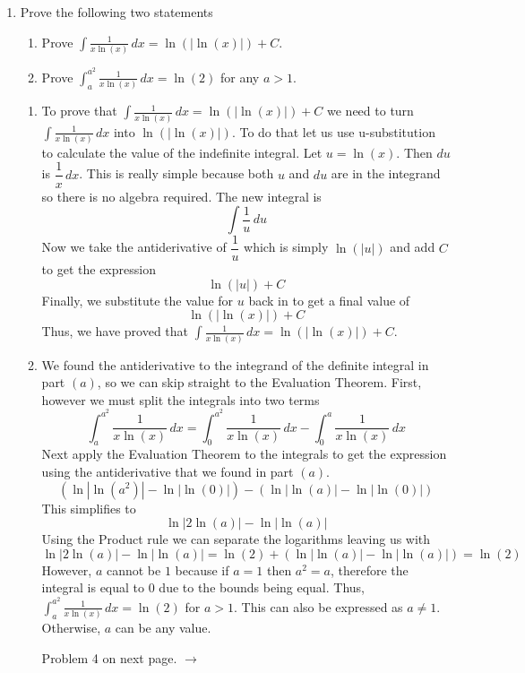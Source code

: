 \documentclass{article}
\begin{document}
\begin{enumerate}[label=\textbf{(3.\arabic*)}]
\newpage %

\item Prove the following two statements
\begin{enumerate}[label=(\alph*)]
\item Prove $\displaystyle{ \int\!\frac{1}{x\ln(x)}\,dx=\ln\left(\left|\ln(x)\right|\right)+C}$.
\item Prove $\displaystyle{ \int_a^{a^2}\!\frac{1}{x\ln(x)}\,dx=\ln(2) }$ for any $a>1$. \\
\newline
\end{enumerate}

\begin{enumerate}[label=(\alph*)]
\item To prove that $\displaystyle{ \int\!\frac{1}{x\ln(x)}\,dx=\ln\left(\left|\ln(x)\right|\right)+C}$ we need to turn $\displaystyle{ \int\!\frac{1}{x\ln(x)}\,dx }$ into $\ln\left(\left|\ln(x)\right|\right)$. To do that let us use u-substitution to calculate the value of the indefinite integral.
\newline
Let $u=\ln(x)$. Then $du$ is $\dfrac{1}{x}\,dx$. This is really simple because both $u$ and $du$ are in the integrand so there is no algebra required. The new integral is
\[\int\!\frac{1}{u}\,du\]
Now we take the antiderivative of $\dfrac{1}{u}$ which is simply $\ln(|u|)$ and add $C$ to get the expression
\[\ln(|u|)+C\]
Finally, we substitute the value for $u$ back in to get a final value of
\[\ln\left(\left|\ln(x)\right|\right)+C\]
Thus, we have proved that $\displaystyle{ \int\!\frac{1}{x\ln(x)}\,dx=\ln\left(\left|\ln(x)\right|\right)+C}$. \\%
\newline
\item We found the antiderivative to the integrand of the definite integral in part $(a)$, so we can skip straight to the Evaluation Theorem. First, however we must split the integrals into two terms
\[\int_a^{a^2}\!\frac{1}{x\ln(x)}\,dx=\int_0^{a^2}\!\frac{1}{x\ln(x)}\,dx-\int_0^a\!\frac{1}{x\ln(x)}\,dx\]
Next apply the Evaluation Theorem to the integrals to get the expression using the antiderivative that we found in part $(a)$.
\[\left(\ln\left|\ln\left(a^2\right)\right|-\ln\left|\ln\left(0\right)\right|\right)-\left(\ln\left|\ln(a)\right|-\ln\left|\ln(0)\right|\right)\]
This simplifies to
\[\ln\left|2\ln(a)\right|-\ln\left|\ln(a)\right|\]
Using the Product rule we can separate the logarithms leaving us with
\[\ln\left|2\ln(a)\right|-\ln\left|\ln(a)\right|=\ln(2)+\left(\ln\left|\ln(a)\right|-\ln\left|\ln(a)\right|\right)=\ln(2)\]
However, $a$ cannot be $1$ because if $a=1$ then $a^2=a$, therefore the integral is equal to 0 due to the bounds being equal. Thus, $\displaystyle{ \int_a^{a^2}\!\frac{1}{x\ln(x)}\,dx=\ln(2) }$ for $a>1$. This can also be expressed as $a\neq 1$. Otherwise, $a$ can be any value.
\newline
\begin{center}
Problem 4 on next page. $\rightarrow$
\end{center}
\end{enumerate}


\end{enumerate}
\end{document}
